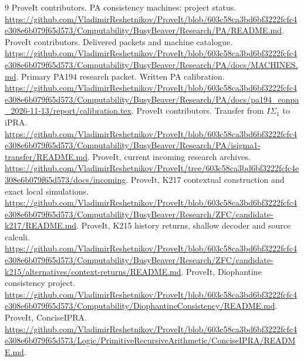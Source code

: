 \documentclass[10pt,letterpaper]{article}
\begin{document}
\clearpage\begin{thebibliography}{9}
 ProveIt contributors. PA consistency machines: project status.
\url{https://github.com/VladimirReshetnikov/ProveIt/blob/603c58ca3bd6bf3222fcfc4e308e6b079f65d573/Computability/BusyBeaver/Research/PA/README.md}.
 ProveIt contributors. Delivered packets and machine catalogue.
\url{https://github.com/VladimirReshetnikov/ProveIt/blob/603c58ca3bd6bf3222fcfc4e308e6b079f65d573/Computability/BusyBeaver/Research/PA/docs/MACHINES.md}.
 Primary PA194 research packet. Written PA calibration.
\url{https://github.com/VladimirReshetnikov/ProveIt/blob/603c58ca3bd6bf3222fcfc4e308e6b079f65d573/Computability/BusyBeaver/Research/PA/docs/pa194_conpa_2026-11-13/report/calibration.tex}.
 ProveIt contributors. Transfer from $I\Sigma_1$ to iPRA.
\url{https://github.com/VladimirReshetnikov/ProveIt/blob/603c58ca3bd6bf3222fcfc4e308e6b079f65d573/Computability/BusyBeaver/Research/PA/isigma1-transfer/README.md}.
 ProveIt, current incoming research archives.
\url{https://github.com/VladimirReshetnikov/ProveIt/tree/603c58ca3bd6bf3222fcfc4e308e6b079f65d573/docs/incoming}.
 ProveIt, K217 contextual construction and exact local simulations.
\url{https://github.com/VladimirReshetnikov/ProveIt/blob/603c58ca3bd6bf3222fcfc4e308e6b079f65d573/Computability/BusyBeaver/Research/ZFC/candidate-k217/README.md}.
 ProveIt, K215 history returns, shallow decoder and source calculi.
\url{https://github.com/VladimirReshetnikov/ProveIt/blob/603c58ca3bd6bf3222fcfc4e308e6b079f65d573/Computability/BusyBeaver/Research/ZFC/candidate-k215/alternatives/context-returns/README.md}.
 ProveIt, Diophantine consistency project.
\url{https://github.com/VladimirReshetnikov/ProveIt/blob/603c58ca3bd6bf3222fcfc4e308e6b079f65d573/Computability/DiophantineConsistency/README.md}.
 ProveIt, ConciseIPRA.
\url{https://github.com/VladimirReshetnikov/ProveIt/blob/603c58ca3bd6bf3222fcfc4e308e6b079f65d573/Logic/PrimitiveRecursiveArithmetic/ConciseIPRA/README.md}.
\end{thebibliography}
\end{document}
